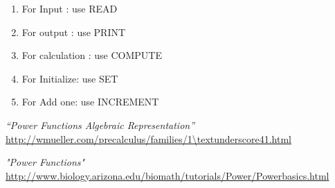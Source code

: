 \documentclass[a4paper,12pt]{article}
\begin{document}
\begin{enumerate}
	\item For Input : use READ
	\item For output : use PRINT
	\item For calculation : use COMPUTE
	\item For Initialize: use SET 
	\item For Add one: use INCREMENT 
\end{enumerate}


\vspace{2cm}

\begin{thebibliography}{3}
	
	 \emph{“Power Functions Algebraic Representation”} \url{http://wmueller.com/precalculus/families/1\textunderscore41.html} 
	
	 \emph{"Power Functions"} \url{http://www.biology.arizona.edu/biomath/tutorials/Power/Powerbasics.html}
	
\end{thebibliography}

\end{document}
